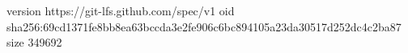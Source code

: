 version https://git-lfs.github.com/spec/v1
oid sha256:69cd1371fe8bb8ea63bccda3e2fe906c6bc894105a23da30517d252dc4c2ba87
size 349692
